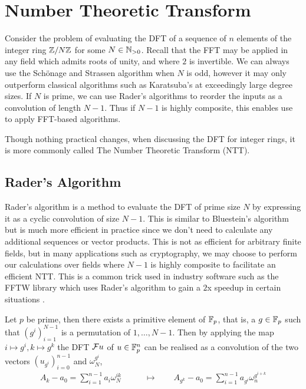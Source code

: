 \section{Number Theoretic Transform}
\label{sec:ntt}


Consider the problem of evaluating the DFT of a sequence of $n$ elements of the integer ring ${\mathbb Z}/N{\mathbb Z}$ for some $N \in {\mathbb N}_{> 0}$. Recall that the FFT may be applied in any field which admits roots of unity, and where $2$ is invertible. We can always use the Sch\"{o}nage and Strassen algorithm when $N$ is odd, however it may only outperform classical algorithms such as Karatsuba's at exceedingly large degree sizes. If $N$ is prime, we can use Rader's algorithms to reorder the inputs as a convolution of length $N-1$. Thus if $N - 1$ is highly composite, this enables use to apply FFT-based algorithms. 

Though nothing practical changes, when discussing the DFT for integer rings, it is more commonly called The Number Theoretic Transform (NTT). 

\subsection{Rader's Algorithm}
\label{subsec:rt}

Rader's algorithm is a method to evaluate the DFT of prime size $N$ by expressing it as a cyclic convolution of size $N - 1$. This is similar to Bluestein's algorithm but is much more efficient in practice since we don't need to calculate any additional sequences or vector products. This is not as efficient for arbitrary finite fields, but in many applications such as cryptography, we may choose to perform our calculations over fields where $N - 1$ is highly composite to facilitate an efficient NTT. This is a common trick used in industry software such as the FFTW library which uses Rader's algorithm to gain a $2$x speedup in certain situations \cite{fftw}.


\begin{definition}\label{thm:rader-transform}
    Let $p$ be prime, then there exists a primitive element of ${\mathbb F}_p$, that is, a $g \in {\mathbb F}_p$ such that $(g^i)_{i=1}^{N-1}$ is a permutation of $1, \ldots, N-1$. Then by applying the map $i \mapsto g^i, k \mapsto g^k$ the DFT $\mathcal Fu$ of $u \in {\mathbb F}_p^n$ can be realised as a convolution of the two vectors $(u_{g^i})_{i=0}^{n-1}$ and $\omega_N^{g^i}$,
    \begin{align*}
        A_k - a_0 = \sum^{n-1}_{i=1} a_i \omega_N^{ik} \qquad &\mapsto \qquad A_{g^k} - a_0 = \sum^{n-1}_{i=1} a_{g^i}\omega_n^{g^{i+k}}
    \end{align*}
\end{definition}

